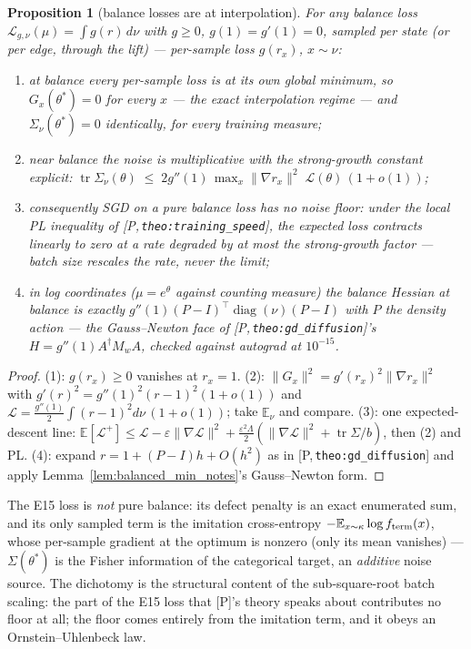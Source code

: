 \documentclass[11pt]{article}
\newtheorem{proposition}[theorem]{Proposition}
\theoremstyle{definition}
\theoremstyle{remark}
\newcommand{\paperref}[1]{[P,\,\texttt{#1}]}   %
\begin{document}
\begin{proposition}[balance losses are at interpolation]\label{prop:interpolation_notes}
For any balance loss $\mathcal L_{g,\nu}(\mu)=\int g(r)\,d\nu$ with $g\geq0$,
$g(1)=g'(1)=0$, sampled per state (or per edge, through the lift) --- per-sample loss
$g(r_x)$, $x\sim\nu$:
\begin{enumerate}
    \item at balance every per-sample loss is at its own \emph{global} minimum, so
    $G_x(\theta^*)=0$ for every $x$ --- the exact interpolation regime --- and
    $\Sigma_\nu(\theta^*)=0$ identically, \emph{for every training measure};
    \item near balance the noise is multiplicative with the strong-growth constant
    explicit: $\operatorname{tr}\Sigma_\nu(\theta)\;\leq\;
    2g''(1)\,\max_x\|\nabla r_x\|^2\;\mathcal L(\theta)\,(1+o(1))$;
    \item consequently SGD on a pure balance loss has \emph{no noise floor}: under the
    local PL inequality of \paperref{theo:training\_speed}, the expected loss contracts
    linearly to zero at a rate degraded by at most the strong-growth factor
    \citep[the mechanism of][]{vaswani2019fast} --- batch size rescales the rate, never
    the limit;
    \item in log coordinates ($\mu = e^\theta$ against counting measure) the balance
    Hessian at balance is exactly $g''(1)(P-I)^\top\!\operatorname{diag}(\nu)(P-I)$ with
    $P$ the density action --- the Gauss--Newton face of
    \paperref{theo:gd\_diffusion}'s $H = g''(1)A^\dagger M_wA$, checked against autograd
    at $10^{-15}$.
\end{enumerate}
\end{proposition}

\begin{proof}
(1): $g(r_x)\geq0$ vanishes at $r_x=1$. (2): $\|G_x\|^2 = g'(r_x)^2\|\nabla r_x\|^2$
with $g'(r)^2 = g''(1)^2(r-1)^2(1+o(1))$ and $\mathcal L =
\tfrac{g''(1)}2\int(r-1)^2d\nu\,(1+o(1))$; take $\mathbb E_\nu$ and compare.
(3): one expected-descent line: $\mathbb E[\mathcal L^+]\leq\mathcal L
-\varepsilon\|\nabla\mathcal L\|^2 + \tfrac{\varepsilon^2\Lambda}2
(\|\nabla\mathcal L\|^2 + \operatorname{tr}\Sigma/b)$, then (2) and PL. (4): expand
$r = 1 + (P-I)h + O(h^2)$ as in \paperref{theo:gd\_diffusion} and apply
Lemma~\ref{lem:balanced_min_notes}'s Gauss--Newton form.
\end{proof}

The E15 loss is \emph{not} pure balance: its defect penalty is an exact enumerated sum,
and its only sampled term is the imitation cross-entropy $-\mathbb
E_{x\sim\kappa}\log f_{\mathrm{term}}(x)$, whose per-sample gradient at the optimum is nonzero
(only its mean vanishes) --- $\Sigma(\theta^*)$ is the Fisher information of the
categorical target, an \emph{additive} noise source. The dichotomy is the structural
content of the sub-square-root batch scaling: the part of the E15 loss that [P]'s theory
speaks about contributes no floor at all; the floor comes entirely from the imitation
term, and it obeys an Ornstein--Uhlenbeck law.
\end{document}
